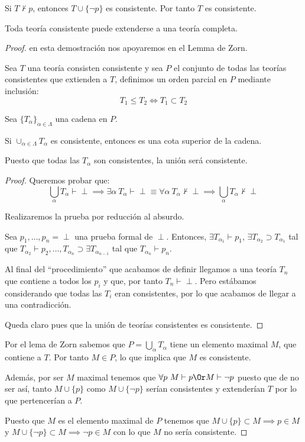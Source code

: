 \documentclass{apuntes}
\begin{document}
\begin{theorem}
	Si $T \nvdash p$, entonces $T\cup \{\neg p\}$ es consistente. Por tanto $T$ es consistente.
	\label{thm:pconsnegp}
\end{theorem}

\begin{theorem}
	Toda teoría consistente puede extenderse a una teoría completa.
	\label{thm:lindenbaum}
\end{theorem}
\begin{proof}
	en esta demostración nos apoyaremos en el Lemma de Zorn. 

	Sea $T$ una teoría consisten consistente y sea $P$ el conjunto de todas las teorías consistentes que extienden a $T$, definimos un orden parcial en $P$ mediante inclusión:
	\[T_1\le T_2 \iff T_1\subset T_2\]

	Sea $\{T_\alpha\}_{\alpha\in\Lambda}$ una cadena en $P$.

	Si $\cup_{\alpha\in\Lambda} T_\alpha$ es consistente, entonces es una cota superior de la cadena. 

	Puesto que todas las $T_\alpha$ son consistentes, la unión será consistente.
	\begin{proof}
	Queremos probar que:
	\[\bigcup_α T_α \vdash \perp \implies \exists α \ T_α \vdash \perp \equiv \forall α \ T_α \nvdash \perp \implies \bigcup_αT_α \nvdash \perp\]

	Realizaremos la prueba por reducción al absurdo. 

	Sea $p_1,\hdots,p_n = \perp$ una prueba formal de $\perp$. Entonces, $\exists T_{\alpha_1}\vdash p_1$, $\exists T_{\alpha_2} \supset T_{\alpha_1}$ tal que $T_{\alpha_2}\vdash p_2, \hdots, T_{\alpha_n}\supset \exists T_{\alpha_{n-1}}$ tal que $T_{\alpha_n}\vdash p_n$.

	\obs Al final del ``procedimiento'' que acabamos de definir llegamos a una teoría $T_n$ que contiene a todos los $p_i$ y que, por tanto $T_n \vdash \perp$. Pero estábamos considerando que todas las $T_i$ eran consistentes, por lo que acabamos de llegar a una contradicción.

	Queda claro pues que la unión de teorías consistentes es consistente.
	\end{proof}

	Por el lema de Zorn sabemos que $P=\bigcup_αT_α$ tiene un elemento maximal $M$, que contiene a $T$. Por tanto $M\in P$, lo que implica que $M$ es consistente.

	Además, por ser $M$ maximal tenemos que $\forall p \ M \vdash p \Or M \vdash \neg p$ puesto que de no ser así, tanto $M\cup\{p\}$ como $M\cup\{\neg p\}$ serían consistentes y extenderían $T$ por lo que pertencerían a $P$. 

	Puesto que $M$ es el elemento maximal de $P$ tenemos que $M\cup\{p\} \subset M \implies p \in M$ y $M\cup\{\neg p\}\subset M \implies \neg p \in M$ con lo que $M$ no sería consistente.
\end{proof}
\end{document}
